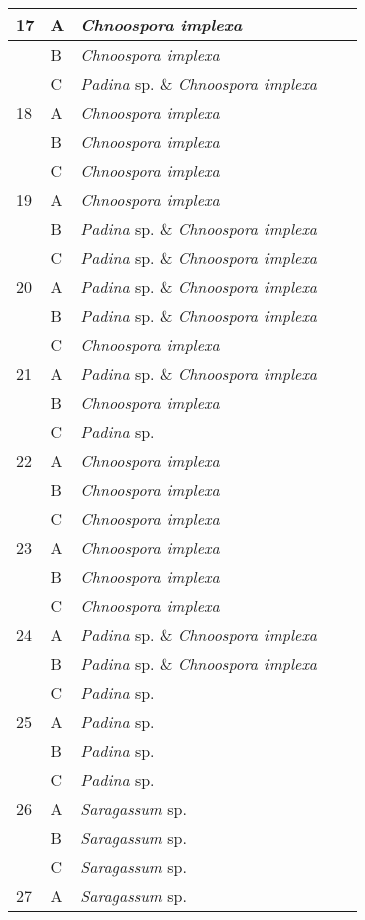 \documentclass[12pt]{article}
\begin{document}
\begin{longtable}{ | p{1cm} | p{1cm} | p{3cm} | p{4cm} | p{4cm} | }
\hline
17&A&\emph{Chnoospora implexa}&&\\
\hline
&B&\emph{Chnoospora implexa}&&\\
\hline
&C&\emph{Padina} sp. \& \emph{Chnoospora implexa}&&\\
\hline
18&A&\emph{Chnoospora implexa}&&\\
\hline
&B&\emph{Chnoospora implexa}&&\\
\hline
&C&\emph{Chnoospora implexa}&&\\
\hline
19&A&\emph{Chnoospora implexa}&&\\
\hline
&B&\emph{Padina} sp. \& \emph{Chnoospora implexa}&&\\
\hline
&C&\emph{Padina} sp. \& \emph{Chnoospora implexa}&&\\
\hline
20&A&\emph{Padina} sp. \& \emph{Chnoospora implexa}&&\\
\hline
&B&\emph{Padina} sp. \& \emph{Chnoospora implexa}&&\\
\hline
&C&\emph{Chnoospora implexa}&&\\
\hline
21&A&\emph{Padina} sp. \& \emph{Chnoospora implexa}&&\\
\hline
&B&\emph{Chnoospora implexa}&&\\
\hline
&C&\emph{Padina} sp.&&\\
\hline
22&A&\emph{Chnoospora implexa}&&\\
\hline
&B&\emph{Chnoospora implexa}&&\\
\hline
&C&\emph{Chnoospora implexa}&&\\
\hline
23&A&\emph{Chnoospora implexa}&&\\
\hline
&B&\emph{Chnoospora implexa}&&\\
\hline
&C&\emph{Chnoospora implexa}&&\\
\hline
24&A&\emph{Padina} sp. \& \emph{Chnoospora implexa}&&\\
\hline
&B&\emph{Padina} sp. \& \emph{Chnoospora implexa}&&\\
\hline
&C&\emph{Padina} sp.&&\\
\hline
25&A&\emph{Padina} sp.&&\\
\hline
&B&\emph{Padina} sp.&&\\
\hline
&C&\emph{Padina} sp.&&\\
\hline
26&A&\emph{Saragassum} sp.&&\\
\hline
&B&\emph{Saragassum} sp.&&\\
\hline
&C&\emph{Saragassum} sp.&&\\
\hline
27&A&\emph{Saragassum} sp.&&\\

\end{longtable}
\end{document}

